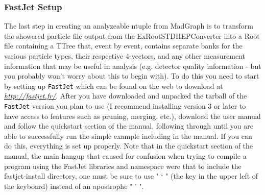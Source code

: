 \documentclass[12pt]{article}
\begin{document}
\subsubsection{FastJet Setup}
The last step in creating an analyzeable ntuple from MadGraph is to transform the showered particle file output from the ExRootSTDHEPConverter into a Root file containing a TTree that, event by event, contains separate banks for the various particle types, their respective 4-vectors, and any other measurement information that may be useful in analysis (e.g. detector quality information - but you probably won't worry about this to begin with).  
To do this you need to start by setting up \texttt{FastJet} which can be found on the web to download at \href{http://fastjet.fr/}{\textit{http://fastjet.fr/}}.  After you have downloaded and unpacked the tarball of the \texttt{FastJet} version you plan to use (I recommend installing version 3 or later to have access to features such as pruning, merging, etc.), download the user manual and follow the quickstart section of the manual, following through until you are able to successfully run the simple example including in the manual.  If you can do this, everything is set up properly.  Note that in the quickstart section of the manual, the main hangup that caused for confusion when trying to compile a program using the FastJet libraries and namespace were that to include the fastjet-install directory, one must be sure to use " ` " (the key in the upper left of the keyboard) instead of an apostrophe " ' ".  \\ 
\end{document}

